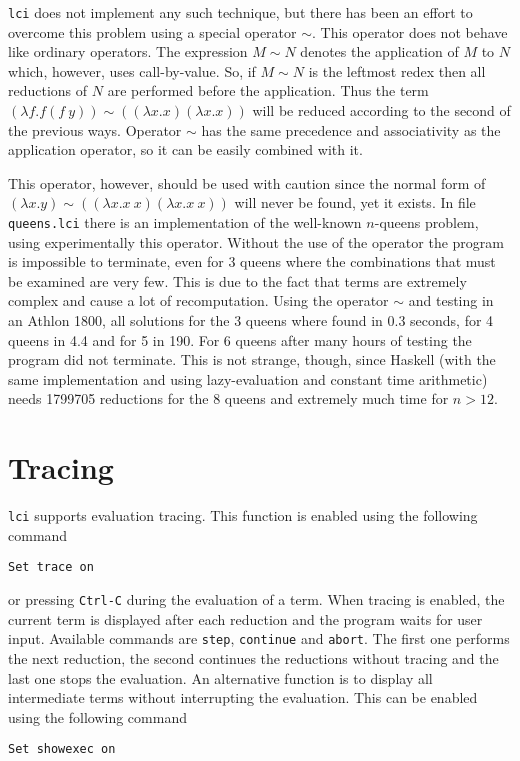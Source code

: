 \documentclass[a4paper,11pt]{article}
\newcommand{\lci}{\texttt{lci}}
\newcommand{\kwd}[1]{\texttt{#1}}
\newcommand{\en}[1]{#1}
\begin{document}
\lci{} does not implement any such technique, but there has been an effort to
overcome this problem using a special operator $\sim$. This operator does not
behave like ordinary operators. The expression $M\sim N$ denotes the application
of $M$ to $N$ which, however, uses call-by-value. So, if $M\sim N$ is the leftmost
redex then all reductions of $N$ are performed before the application. Thus the
term $(\lambda f.f(f\ y))\sim((\lambda x.x)(\lambda x.x))$ will be reduced according
to the second of the previous ways. Operator $\sim$ has the same precedence and
associativity as the application operator, so it can be easily combined with it.

This operator, however, should be used with caution since the normal form of
$(\lambda x.y)\sim ((\lambda x.x\ x)(\lambda x.x\ x))$ will never be found, yet
it exists. In file \kwd{queens.lci} there is an implementation of the well-known
$n$-queens problem, using experimentally this operator. Without the use of the
operator the program is impossible to terminate, even for 3 queens where the
combinations that must be examined are very few. This is due to the fact that
terms are extremely complex and cause a lot of recomputation. Using the operator
$\sim$ and testing in an Athlon 1800, all solutions for the 3 queens where found in
0.3 seconds, for 4 queens in 4.4 and for 5 in 190. For 6 queens after many hours of
testing the program did not terminate. This is not strange, though, since Haskell
(with the same implementation and using lazy-evaluation and constant time arithmetic)
needs 1799705 reductions for the 8 queens and extremely much time for $n>12$.

\section{\en{Tracing}}
\lci{} supports evaluation tracing. This function is enabled using the following
command
\begin{center}
	\kwd{Set trace on}
\end{center}
or pressing \kwd{Ctrl-C} during the evaluation of a term. When tracing is enabled,
the current term is displayed after each reduction and the program waits for user
input. Available commands are \kwd{step}, \kwd{continue} and \kwd{abort}. The
first one performs the next reduction, the second continues the reductions without
tracing and the last one stops the evaluation. An alternative function is to display
all intermediate terms without interrupting the evaluation. This can be enabled
using the following command
\begin{center}
	\kwd{Set showexec on}
\end{center}
\end{document}
